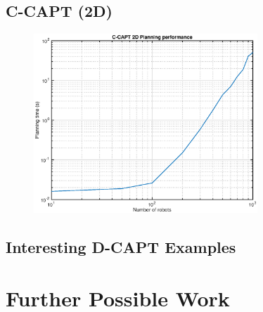 \documentclass[11pt]{article}
\begin{document}
\subsection{C-CAPT (2D)}
\begin{figure}[H]
\center
\includegraphics[width=0.75\textwidth]{images/timing_phase1.eps}
\end{figure}

\subsection{Interesting D-CAPT Examples}



\section{Further Possible Work}
\end{document}
